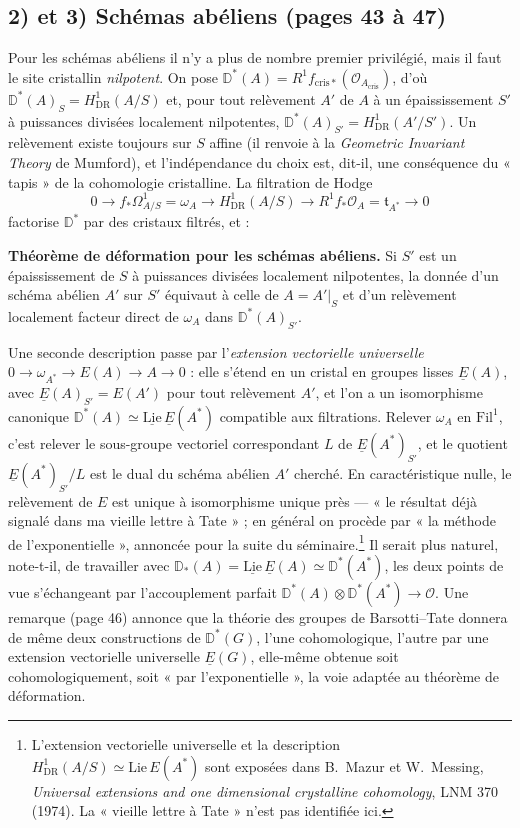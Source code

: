 \documentclass[11pt,a4paper]{article}
\begin{document}
\subsection*{2) et 3) Schémas abéliens (pages 43 à 47)}

Pour les schémas abéliens il n'y a plus de nombre premier privilégié, mais
il faut le site cristallin \emph{nilpotent}. On pose
$\mathbb{D}^*(A) = R^1 f_{\mathrm{cris}*}(\mathcal{O}_{A_{\mathrm{cris}}})$, d'où
$\mathbb{D}^*(A)_S = H^1_{\mathrm{DR}}(A/S)$ et, pour tout relèvement $A'$ de $A$
à un épaississement $S'$ à puissances divisées localement nilpotentes,
$\mathbb{D}^*(A)_{S'} = H^1_{\mathrm{DR}}(A'/S')$. Un relèvement existe toujours
sur $S$ affine (il renvoie à la \emph{Geometric Invariant Theory} de
Mumford), et l'indépendance du choix est, dit-il, une conséquence du
« tapis » de la cohomologie cristalline. La filtration de Hodge
\[
  0 \to f_*\Omega^1_{A/S} = \omega_A \to H^1_{\mathrm{DR}}(A/S)
  \to R^1 f_*\mathcal{O}_A = \mathfrak{t}_{A^*} \to 0
\]
factorise $\mathbb{D}^*$ par des cristaux filtrés, et :

\textbf{Théorème de déformation pour les schémas abéliens.} Si $S'$ est un
épaississement de $S$ à puissances divisées localement nilpotentes, la donnée
d'un schéma abélien $A'$ sur $S'$ équivaut à celle de $A = A'|_S$ et d'un
relèvement localement facteur direct de $\omega_A$ dans $\mathbb{D}^*(A)_{S'}$.

Une seconde description passe par l'\emph{extension vectorielle universelle}
$0 \to \omega_{A^*} \to E(A) \to A \to 0$ : elle s'étend en un cristal en
groupes lisses $\underline{E}(A)$, avec $\underline{E}(A)_{S'} = E(A')$ pour tout
relèvement $A'$, et l'on a un isomorphisme canonique
$\mathbb{D}^*(A) \simeq \underline{\mathrm{Lie}}\,\underline{E}(A^*)$ compatible aux
filtrations. Relever $\omega_A$ en $\mathrm{Fil}^1$, c'est relever le
sous-groupe vectoriel correspondant $L$ de $\underline{E}(A^*)_{S'}$, et le
quotient $\underline{E}(A^*)_{S'}/L$ est le dual du schéma abélien $A'$
cherché. En caractéristique nulle, le relèvement de $E$ est unique à
isomorphisme unique près — « le résultat déjà signalé dans ma vieille lettre
à Tate » ; en général on procède par « la méthode de l'exponentielle »,
annoncée pour la suite du séminaire.\footnote{L'extension vectorielle
universelle et la description $H^1_{\mathrm{DR}}(A/S) \simeq \mathrm{Lie}\,E(A^*)$
sont exposées dans B.~Mazur et W.~Messing, \emph{Universal extensions and
one dimensional crystalline cohomology}, LNM 370 (1974). La « vieille lettre
à Tate » n'est pas identifiée ici.} Il serait plus naturel, note-t-il, de
travailler avec $\mathbb{D}_*(A) = \underline{\mathrm{Lie}}\,\underline{E}(A)
\simeq \mathbb{D}^*(A^*)$, les deux points de vue s'échangeant par
l'accouplement parfait $\mathbb{D}^*(A) \otimes \mathbb{D}^*(A^*) \to
\mathcal{O}$. Une remarque (page 46) annonce que la théorie des groupes de
Barsotti--Tate donnera de même deux constructions de $\mathbb{D}^*(G)$, l'une
cohomologique, l'autre par une extension vectorielle universelle
$\underline{E}(G)$, elle-même obtenue soit cohomologiquement, soit « par
l'exponentielle », la voie adaptée au théorème de déformation.
\end{document}
